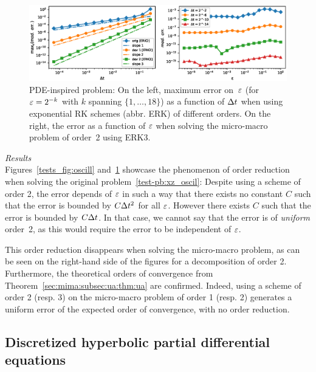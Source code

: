 \begin{figure}
  \vspace*{-12pt}
  \includegraphics[width=\textwidth]{./miMa_Dissipatif/hyperb_ode.eps}
  \vspace*{-24pt}
  \caption{PDE-inspired problem: On the left, maximum error on~$\varepsilon$ (for
  $\varepsilon = 2^{-k}$ with $k$ spanning $\{1, \ldots, 18\}$) as a function of
  $\Delta t$ when using exponential RK schemes (abbr. ERK) of different orders.
  On the right, the error as a function of $\varepsilon$ when solving the
  micro-macro problem of order~2 using ERK3.}
  \label{tests_fig:hyperb_ode}
\end{figure}

\medskip
\noindent\textit{Results}\\
%
Figures~\ref{tests_fig:oscill} and~\ref{tests_fig:hyperb_ode} showcase the
phenomenon of order reduction when solving the original
problem~\eqref{test-pb:xz_oscil}: Despite using a scheme of order 2, the
error depends of $\varepsilon$ in such a way that there exists no constant $C$
such that the error is bounded by $C\Delta t^2$ for all $\varepsilon$. However there
exists $C$ such that the error is bounded by $C\Delta t$. In that case, we
cannot say that the error is of \textit{uniform} order~2, as this would
require the error to be independent of $\varepsilon$.

This order reduction disappears when solving the micro-macro problem, as
can be seen on the right-hand side of the figures for a decomposition of
order 2. Furthermore, the theoretical orders of convergence from
Theorem~\ref{sec:mima:subsec:ua:thm:ua} are confirmed. Indeed, using a
scheme of order 2 (resp. 3) on the micro-macro problem of order 1 (resp.
2) generates a uniform error of the expected order of convergence, with no
order reduction. 



\subsection{Discretized hyperbolic partial differential equations}
\label{sec:tests:subsec:pde}
\hspace*{1em}

